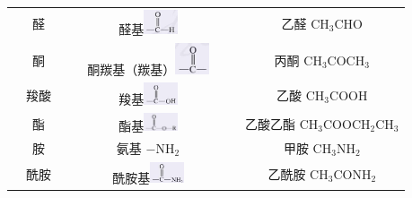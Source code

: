 \documentclass[10pt]{article}
\begin{document}
\begin{center}
{\begin{tabular}{|c|c|c|c|}
\cline{2-4}
& 醛 & 醛基\includegraphics[max width=0.2\textwidth]{images/0190efc5-b58a-7c43-bfb0-e0a030df9cfd_10_839826.jpg} & 乙醛 \({\mathrm{{CH}}}_{3}\mathrm{{CHO}}\) \\
\cline{2-4}
& 酮 & 酮羰基（羰基）\includegraphics[max width=0.2\textwidth]{images/0190efc5-b58a-7c43-bfb0-e0a030df9cfd_10_839827.jpg} & 丙酮 \({\mathrm{{CH}}}_{3}{\mathrm{{COCH}}}_{3}\) \\
\cline{2-4}
& 羧酸 & 羧基\includegraphics[max width=0.2\textwidth]{images/0190efc5-b58a-7c43-bfb0-e0a030df9cfd_10_839828.jpg} & 乙酸 \({\mathrm{{CH}}}_{3}\mathrm{{COOH}}\) \\
\cline{2-4}
& 酯 & 酯基\includegraphics[max width=0.2\textwidth]{images/0190efc5-b58a-7c43-bfb0-e0a030df9cfd_10_839829.jpg} & 乙酸乙酯 \({\mathrm{{CH}}}_{3}{\mathrm{{COOCH}}}_{2}{\mathrm{{CH}}}_{3}\) \\
\cline{2-4}
& 胺 & 氨基 \(- {\mathrm{{NH}}}_{2}\) & 甲胺 \({\mathrm{{CH}}}_{3}{\mathrm{{NH}}}_{2}\) \\
\cline{2-4}
& 酰胺 & 酰胺基\includegraphics[max width=0.2\textwidth]{images/0190efc5-b58a-7c43-bfb0-e0a030df9cfd_10_839830.jpg} & 乙酰胺 \({\mathrm{{CH}}}_{3}{\mathrm{{CONH}}}_{2}\) \\
\hline
\end{tabular}
}
\end{center}
\end{document}
